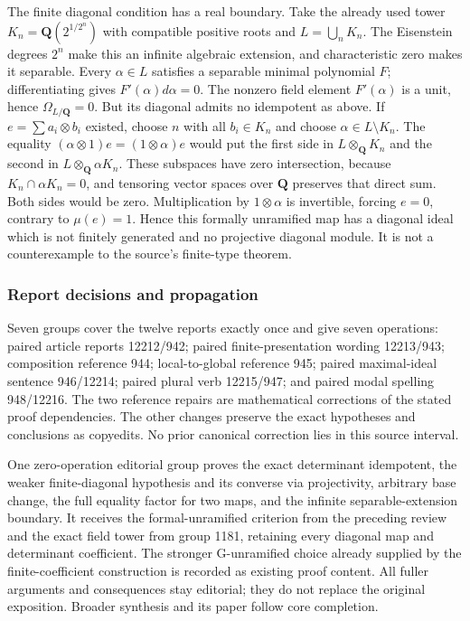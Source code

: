 The finite diagonal condition has a real boundary. Take the already used tower \(K_n=\mathbf Q(2^{1/2^n})\) with compatible positive roots and \(L=\bigcup_nK_n\). The Eisenstein degrees \(2^n\) make this an infinite algebraic extension, and characteristic zero makes it separable. Every \(\alpha\in L\) satisfies a separable minimal polynomial \(F\); differentiating gives \(F'(\alpha)d\alpha=0\). The nonzero field element \(F'(\alpha)\) is a unit, hence \(\Omega_{L/\mathbf Q}=0\). But its diagonal admits no idempotent as above. If \(e=\sum a_i\otimes b_i\) existed, choose \(n\) with all \(b_i\in K_n\) and choose \(\alpha\in L\setminus K_n\). The equality \((\alpha\otimes1)e=(1\otimes\alpha)e\) would put the first side in \(L\otimes_{\mathbf Q}K_n\) and the second in \(L\otimes_{\mathbf Q}\alpha K_n\). These subspaces have zero intersection, because \(K_n\cap\alpha K_n=0\), and tensoring vector spaces over \(\mathbf Q\) preserves that direct sum. Both sides would be zero. Multiplication by \(1\otimes\alpha\) is invertible, forcing \(e=0\), contrary to \(\mu(e)=1\). Hence this formally unramified map has a diagonal ideal which is not finitely generated and no projective diagonal module. It is not a counterexample to the source's finite-type theorem.

\subsubsection{Report decisions and propagation}\label{report-decisions-and-propagation}

Seven groups cover the twelve reports exactly once and give seven operations: paired article reports 12212/942; paired finite-presentation wording 12213/943; composition reference 944; local-to-global reference 945; paired maximal-ideal sentence 946/12214; paired plural verb 12215/947; and paired modal spelling 948/12216. The two reference repairs are mathematical corrections of the stated proof dependencies. The other changes preserve the exact hypotheses and conclusions as copyedits. No prior canonical correction lies in this source interval.

One zero-operation editorial group proves the exact determinant idempotent, the weaker finite-diagonal hypothesis and its converse via projectivity, arbitrary base change, the full equality factor for two maps, and the infinite separable-extension boundary. It receives the formal-unramified criterion from the preceding review and the exact field tower from group 1181, retaining every diagonal map and determinant coefficient. The stronger G-unramified choice already supplied by the finite-coefficient construction is recorded as existing proof content. All fuller arguments and consequences stay editorial; they do not replace the original exposition. Broader synthesis and its paper follow core completion.
